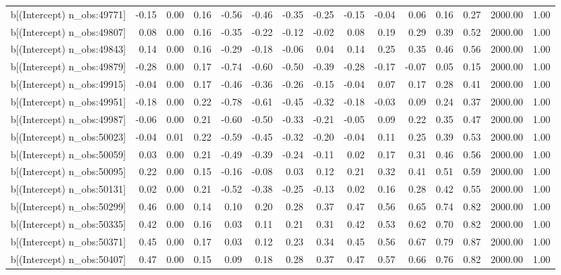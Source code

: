 \begin{table}[ht]
\begin{tabular}{rrrrrrrrrrrrrrr}
  b[(Intercept) n\_obs:49771] & -0.15 & 0.00 & 0.16 & -0.56 & -0.46 & -0.35 & -0.25 & -0.15 & -0.04 & 0.06 & 0.16 & 0.27 & 2000.00 & 1.00 \\ 
  b[(Intercept) n\_obs:49807] & 0.08 & 0.00 & 0.16 & -0.35 & -0.22 & -0.12 & -0.02 & 0.08 & 0.19 & 0.29 & 0.39 & 0.52 & 2000.00 & 1.00 \\ 
  b[(Intercept) n\_obs:49843] & 0.14 & 0.00 & 0.16 & -0.29 & -0.18 & -0.06 & 0.04 & 0.14 & 0.25 & 0.35 & 0.46 & 0.56 & 2000.00 & 1.00 \\ 
  b[(Intercept) n\_obs:49879] & -0.28 & 0.00 & 0.17 & -0.74 & -0.60 & -0.50 & -0.39 & -0.28 & -0.17 & -0.07 & 0.05 & 0.15 & 2000.00 & 1.00 \\ 
  b[(Intercept) n\_obs:49915] & -0.04 & 0.00 & 0.17 & -0.46 & -0.36 & -0.26 & -0.15 & -0.04 & 0.07 & 0.17 & 0.28 & 0.41 & 2000.00 & 1.00 \\ 
  b[(Intercept) n\_obs:49951] & -0.18 & 0.00 & 0.22 & -0.78 & -0.61 & -0.45 & -0.32 & -0.18 & -0.03 & 0.09 & 0.24 & 0.37 & 2000.00 & 1.00 \\ 
  b[(Intercept) n\_obs:49987] & -0.06 & 0.00 & 0.21 & -0.60 & -0.50 & -0.33 & -0.21 & -0.05 & 0.09 & 0.22 & 0.35 & 0.47 & 2000.00 & 1.00 \\ 
  b[(Intercept) n\_obs:50023] & -0.04 & 0.01 & 0.22 & -0.59 & -0.45 & -0.32 & -0.20 & -0.04 & 0.11 & 0.25 & 0.39 & 0.53 & 2000.00 & 1.00 \\ 
  b[(Intercept) n\_obs:50059] & 0.03 & 0.00 & 0.21 & -0.49 & -0.39 & -0.24 & -0.11 & 0.02 & 0.17 & 0.31 & 0.46 & 0.56 & 2000.00 & 1.00 \\ 
  b[(Intercept) n\_obs:50095] & 0.22 & 0.00 & 0.15 & -0.16 & -0.08 & 0.03 & 0.12 & 0.21 & 0.32 & 0.41 & 0.51 & 0.59 & 2000.00 & 1.00 \\ 
  b[(Intercept) n\_obs:50131] & 0.02 & 0.00 & 0.21 & -0.52 & -0.38 & -0.25 & -0.13 & 0.02 & 0.16 & 0.28 & 0.42 & 0.55 & 2000.00 & 1.00 \\ 
  b[(Intercept) n\_obs:50299] & 0.46 & 0.00 & 0.14 & 0.10 & 0.20 & 0.28 & 0.37 & 0.47 & 0.56 & 0.65 & 0.74 & 0.82 & 2000.00 & 1.00 \\ 
  b[(Intercept) n\_obs:50335] & 0.42 & 0.00 & 0.16 & 0.03 & 0.11 & 0.21 & 0.31 & 0.42 & 0.53 & 0.62 & 0.70 & 0.82 & 2000.00 & 1.00 \\ 
  b[(Intercept) n\_obs:50371] & 0.45 & 0.00 & 0.17 & 0.03 & 0.12 & 0.23 & 0.34 & 0.45 & 0.56 & 0.67 & 0.79 & 0.87 & 2000.00 & 1.00 \\ 
  b[(Intercept) n\_obs:50407] & 0.47 & 0.00 & 0.15 & 0.09 & 0.18 & 0.28 & 0.37 & 0.47 & 0.57 & 0.66 & 0.76 & 0.82 & 2000.00 & 1.00 \\ 

\end{tabular}
\end{table}
